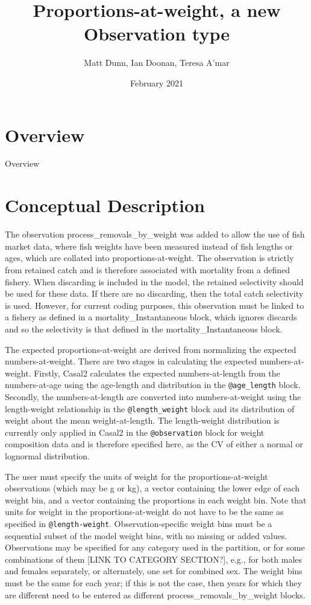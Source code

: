 \documentclass[a4paper,11pt,twoside,pdftex,draft]{article}
\title{Proportions-at-weight, a new Observation type}
\author{Matt Dunn, Ian Doonan, Teresa A'mar}
\date{February 2021}
\begin{document}
\maketitle

\pagestyle{plain}
\setcounter{page}{1}


\newpage

\section{Overview}

Overview

\section{Conceptual Description}

The observation process\_removals\_by\_weight was added to allow the use of fish market data, where fish weights have been measured instead of fish lengths or ages, which are collated into proportions-at-weight. The observation is strictly from retained catch and is therefore associated with mortality from a defined fishery. When discarding is included in the model, the retained selectivity should be used for these data. If there are no discarding, then the total catch selectivity is used. However, for current coding purposes, this observation must be linked to a fishery as defined in a mortality\_Instantaneous block, which ignores discards and so the selectivity is that defined in the mortality\_Instantaneous block.

The expected proportions-at-weight are derived from normalizing the expected numbers-at-weight. There are two stages in calculating the expected numbers-at-weight. Firstly, Casal2 calculates the expected numbers-at-length from the numbers-at-age using the age-length and distribution in the \texttt{@age\_length} block. Secondly, the numbers-at-length are converted into numbers-at-weight using the length-weight relationship in the \texttt{@length\_weight} block and its distribution of weight about the mean weight-at-length. The length-weight distribution is currently only applied in Casal2 in the \texttt{@observation} block for weight composition data and is therefore specified here, as the CV of either a normal or lognormal distribution.

The user must specify the units of weight for the proportions-at-weight observations (which may be g or kg), a vector containing the lower edge of each weight bin, and a vector containing the proportions in each weight bin. Note that units for weight in the proportions-at-weight do not have to be the same as specified in \texttt{@length-weight}. Observation-specific weight bins must be a sequential subset of the model weight bins, with no missing or added values. Observations may be specified for any category used in the partition, or for some combinations of them [LINK TO CATEGORY SECTION?], e.g., for both males and females separately, or alternately, one set for combined sex. The weight bins must be the same for each year; if this is not the case, then years for which they are different need to be entered as different process\_removals\_by\_weight blocks.
\end{document}
